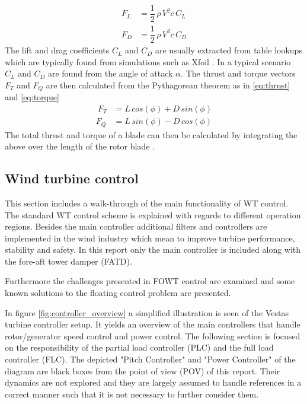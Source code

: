 \begin{align}
	F_L &= \dfrac{1}{2}\,  \rho \, V^2 c \, C_L \label{eq:lift}\\
	F_D &= \dfrac{1}{2} \, \rho \, V^2 c \, C_D \label{eq:drag}
\end{align}
The lift and drag coefficients $ C_L $ and $ C_D $ are usually extracted from table lookups which are typically found from simulations such as Xfoil
. 
In a typical scenario $ C_L $ and $ C_D $ are found from the angle of attack $ \alpha $. The thrust and torque vectors $ F_T $ and $ F_Q $ are then calculated from the Pythagorean theorem as in \cref{eq:thrust} and \cref{eq:torque}
\begin{align}\
	F_T &= L \, cos(\phi) + D \, sin(\phi) \label{eq:thrust} \\
	F_Q &= L \, sin(\phi) - D \, cos(\phi) \label{eq:torque}
\end{align}
The total thrust and torque of a blade can then be calculated by integrating the above over the length of the rotor blade \cite{Knudsen2013}.


\subsection{Wind turbine control} \label{sec:theory_ctrl}
This section includes a walk-through of the main functionality of WT control. The standard WT control scheme is explained with regards to different operation regions. Besides the main controller additional filters and controllers are implemented in the wind industry which mean to improve turbine performance, stability and safety. In this report only the main controller is included along with the fore-aft tower damper (FATD).

Furthermore the challenges presented in FOWT control are examined and some known solutions to the floating control problem are presented.

\medskip
In figure \cref{fig:controller_overview} a simplified illustration is seen of the Vestas turbine controller setup. It yields an overview of the main controllers that handle rotor/generator speed control and power control. The following section is focused on the responsibility of the partial load controller (PLC) and the full load controller (FLC). The depicted "Pitch Controller" and "Power Controller" of the diagram are black boxes from the point of view (POV) of this report. Their dynamics are not explored and they are largely assumed to handle references in a correct manner such that it is not necessary to further consider them. 

